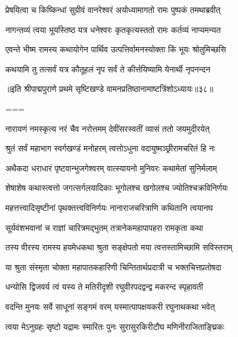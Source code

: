 \twolineshloka
{प्रेषयित्वा च किष्किन्धां सुग्रीवं वानरेश्वरं}
{अयोध्यामागतो रामः पुष्पकं तमथाब्रवीत्}%

\twolineshloka
{नागन्तव्यं त्वया भूयस्तिष्ठ यत्र धनेश्वरः}
{कृतकृत्यस्ततो रामः कर्तव्यं नाप्यमन्यत}%


\twolineshloka
{एवन्ते भीष्म रामस्य कथायोगेन पार्थिव}
{उत्पत्तिर्वामनस्योक्ता किं भूयः श्रोतुमिच्छसि}%

\twolineshloka
{कथयामि तु तत्सर्वं यत्र कौतूहलं नृप}
{सर्वं ते कीर्त्तयिष्यामि येनार्थी नृपनन्दन}%

{॥इति श्रीपाद्मपुराणे प्रथमे सृष्टिखण्डे वामनप्रतिष्ठानामाष्टत्रिंशोऽध्यायः॥३८॥}


===



\twolineshloka
{नारायणं नमस्कृत्य नरं चैव नरोत्तमम्}
{देवींसरस्वतीं व्यासं ततो जयमुदीरयेत्}%


\twolineshloka
{श्रुतं सर्वं महाभाग स्वर्गखण्डं मनोहरम्}
{त्वत्तोऽधुना वदायुष्मञ्छ्रीरामचरितं हि नः}%


\twolineshloka
{अथैकदा धराधारं पृष्टवान्भुजगेश्वरम्}
{वात्स्यायनो मुनिवरः कथामेतां सुनिर्मलाम्}%


\twolineshloka
{शेषाशेष कथास्त्वत्तो जगत्सर्गलयादिकाः}
{भूगोलश्च खगोलश्च ज्योतिश्चक्रविनिर्णयः}%

\twolineshloka
{महत्तत्त्वादिसृष्टीनां पृथक्तत्त्वविनिर्णयः}
{नानाराजचरित्राणि कथितानि त्वयानघ}%

\twolineshloka
{सूर्यवंशभवानां च राज्ञां चारित्रमद्भुतम्}
{तत्रानेकमहापापहरा रामकृता कथा}%

\twolineshloka
{तस्य वीरस्य रामस्य हयमेधकथा श्रुता}
{सङ्क्षेपतो मया त्वत्तस्तामिच्छामि सविस्तराम्}%

\twolineshloka
{या श्रुता संस्मृता चोक्ता महापातकहारिणी}
{चिन्तितार्थप्रदात्री च भक्तचित्तप्रतोषदा}%


\twolineshloka
{धन्योसि द्विजवर्य त्वं यस्य ते मतिरीदृशी}
{रघुवीरपदद्वन्द्व मकरन्द स्पृहावती}%

\twolineshloka
{वदन्ति मुनयः सर्वे साधूनां सङ्गमं वरम्}
{यस्मात्पापक्षयकरी रघुनाथकथा भवेत्}%

\twolineshloka
{त्वया मेऽनुग्रहः सृष्टो यद्रामः स्मारितः पुनः}
{सुरासुरकिरीटौघ मणिनीराजिताङ्घ्रिकः}%

